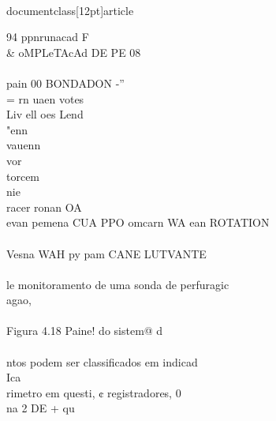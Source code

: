 \\documentclass[12pt]{article}
\begin{document}
94 ppnrunacad F \\& oMPLeTAcAd DE PE 08\\
\\
pain 00 BONDADON -”\\
= rn uaen votes\\
Liv ell oes Lend\\
"enn\\
vauenn\\
vor\\
torcem\\
nie\\
racer ronan OA\\
evan pemena CUA PPO omcarn WA ean ROTATION\\
\\
Vesna WAH py pam CANE LUTVANTE\\
\\
le monitoramento de uma sonda de perfuragic\\
agao,\\
\\
Figura 4.18 Paine! do sistem@ d\\
\\
ntos podem ser classificados em indicad\\
Ica\\
rimetro em questi, ¢ registradores, 0\\
na 2 DE + qu\\
\end{document}
